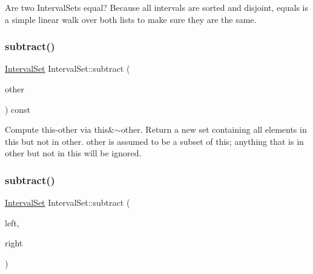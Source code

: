 Are two Interval\+Sets equal? Because all intervals are sorted and disjoint, equals is a simple linear walk over both lists to make sure they are the same. \mbox{\label{classantlr4_1_1misc_1_1IntervalSet_ab21b25a3093c1b6173141a89319589fa}} 
\subsubsection{\texorpdfstring{subtract()}{subtract()}\hspace{0.1cm}{\footnotesize\ttfamily [1/2]}}
{\footnotesize\ttfamily \hyperlink{classantlr4_1_1misc_1_1IntervalSet}{Interval\+Set} Interval\+Set\+::subtract (\begin{DoxyParamCaption}\item[{const \hyperlink{classantlr4_1_1misc_1_1IntervalSet}{Interval\+Set} \&}]{other }\end{DoxyParamCaption}) const}

Compute this-\/other via this\&$\sim$other. Return a new set containing all elements in this but not in other. other is assumed to be a subset of this; anything that is in other but not in this will be ignored. \mbox{\label{classantlr4_1_1misc_1_1IntervalSet_a1a3f30153b722dd4ce77325305b6470a}} 
\subsubsection{\texorpdfstring{subtract()}{subtract()}\hspace{0.1cm}{\footnotesize\ttfamily [2/2]}}
{\footnotesize\ttfamily \hyperlink{classantlr4_1_1misc_1_1IntervalSet}{Interval\+Set} Interval\+Set\+::subtract (\begin{DoxyParamCaption}\item[{const \hyperlink{classantlr4_1_1misc_1_1IntervalSet}{Interval\+Set} \&}]{left,  }\item[{const \hyperlink{classantlr4_1_1misc_1_1IntervalSet}{Interval\+Set} \&}]{right }\end{DoxyParamCaption})\hspace{0.3cm}{\ttfamily [static]}}

